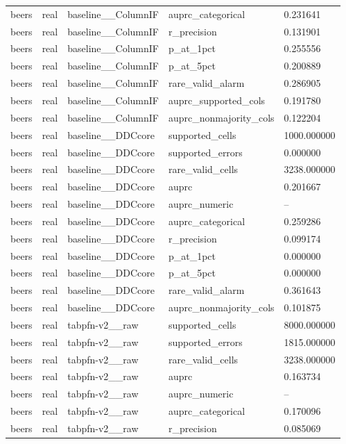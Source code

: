 \begin{tabular}{lllll}
beers & real & baseline\_\_ColumnIF & auprc\_categorical & 0.231641 \\
beers & real & baseline\_\_ColumnIF & r\_precision & 0.131901 \\
beers & real & baseline\_\_ColumnIF & p\_at\_1pct & 0.255556 \\
beers & real & baseline\_\_ColumnIF & p\_at\_5pct & 0.200889 \\
beers & real & baseline\_\_ColumnIF & rare\_valid\_alarm & 0.286905 \\
beers & real & baseline\_\_ColumnIF & auprc\_supported\_cols & 0.191780 \\
beers & real & baseline\_\_ColumnIF & auprc\_nonmajority\_cols & 0.122204 \\
beers & real & baseline\_\_DDCcore & supported\_cells & 1000.000000 \\
beers & real & baseline\_\_DDCcore & supported\_errors & 0.000000 \\
beers & real & baseline\_\_DDCcore & rare\_valid\_cells & 3238.000000 \\
beers & real & baseline\_\_DDCcore & auprc & 0.201667 \\
beers & real & baseline\_\_DDCcore & auprc\_numeric & -- \\
beers & real & baseline\_\_DDCcore & auprc\_categorical & 0.259286 \\
beers & real & baseline\_\_DDCcore & r\_precision & 0.099174 \\
beers & real & baseline\_\_DDCcore & p\_at\_1pct & 0.000000 \\
beers & real & baseline\_\_DDCcore & p\_at\_5pct & 0.000000 \\
beers & real & baseline\_\_DDCcore & rare\_valid\_alarm & 0.361643 \\
beers & real & baseline\_\_DDCcore & auprc\_nonmajority\_cols & 0.101875 \\
beers & real & tabpfn-v2\_\_raw & supported\_cells & 8000.000000 \\
beers & real & tabpfn-v2\_\_raw & supported\_errors & 1815.000000 \\
beers & real & tabpfn-v2\_\_raw & rare\_valid\_cells & 3238.000000 \\
beers & real & tabpfn-v2\_\_raw & auprc & 0.163734 \\
beers & real & tabpfn-v2\_\_raw & auprc\_numeric & -- \\
beers & real & tabpfn-v2\_\_raw & auprc\_categorical & 0.170096 \\
beers & real & tabpfn-v2\_\_raw & r\_precision & 0.085069 \\

\end{tabular}
